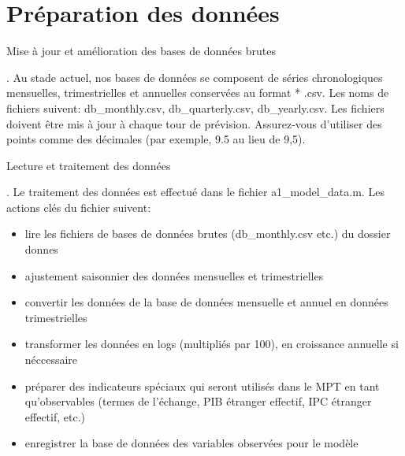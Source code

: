 \section{Préparation des données}
\begin{enumerate}
    {\bf \item  Mise à jour et amélioration des bases de données brutes}. 
    \onehalfspacing Au stade actuel, nos bases de données se composent de séries chronologiques mensuelles, trimestrielles et annuelles conservées au format * .csv.
     Les noms de fichiers suivent: {\color{magenta}db\_monthly.csv}, {\color{magenta}db\_quarterly.csv}, {\color{magenta}db\_yearly.csv}. Les fichiers doivent être mis à jour à chaque tour de prévision. 
Assurez-vous d'utiliser des points comme des décimales (par exemple, 9.5 au lieu de 9,5).
    {\bf \item Lecture et traitement des données}. 
    Le traitement des données est effectué dans le fichier {\color{magenta} a1\_model\_data.m}. Les actions clés du fichier suivent:
    \begin{itemize}
        \item lire les fichiers de bases de données brutes ({\color{magenta}db\_monthly.csv} etc.) du dossier {\color{blue} donnes}
        \item ajustement saisonnier des données mensuelles et trimestrielles
        \item convertir les données de la base de données mensuelle et annuel en données trimestrielles
        \item transformer les données en logs (multipliés par 100), en croissance annuelle si néccessaire
        \item préparer des indicateurs spéciaux qui seront utilisés dans le MPT en tant qu'observables (termes de l'échange, PIB étranger effectif, IPC étranger effectif, etc.) 
        \item enregistrer la base de données des variables observées pour le modèle
    \end{itemize}

\end{enumerate}
